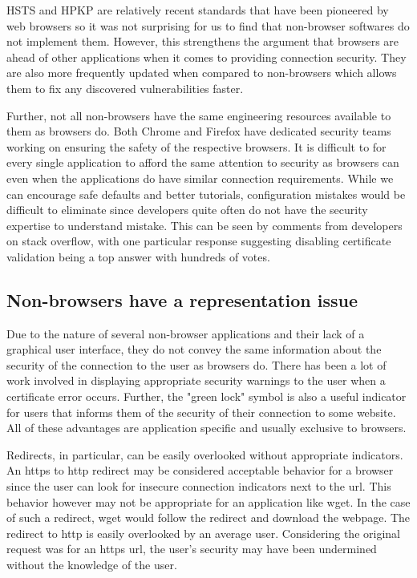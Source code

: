 HSTS and HPKP are relatively recent standards that have been pioneered by web
browsers so it was not surprising for us to find that non-browser softwares do
not implement them. However, this strengthens the argument that browsers are
ahead of other applications when it comes to providing connection security.
They are also more frequently updated when compared to non-browsers which
allows them to fix any discovered vulnerabilities faster.

Further, not all non-browsers have the same engineering resources available to
them as browsers do. Both Chrome and Firefox have dedicated security teams
working on ensuring the safety of the respective browsers. It is difficult to
for every single application to afford the same attention to security as
browsers can even when the applications do have similar connection
requirements. While we can encourage safe defaults and better tutorials,
configuration mistakes would be difficult to eliminate since developers quite
often do not have the security expertise to understand mistake. This can be
seen by comments from developers on stack overflow, with one particular
response suggesting disabling certificate validation being a top answer with
hundreds of votes\cite{stackoverflow-certificate}.

\subsection{Non-browsers have a representation issue}
Due to the nature of several non-browser applications and their lack of a
graphical user interface, they do not convey the same information about the
security of the connection to the user as browsers do. There has been a lot of
work involved in displaying appropriate security warnings to the user when a
certificate error occurs\cite{improve-warnings}. Further, the "green lock"
symbol is also a useful indicator for users that informs them of the security
of their connection to some website. All of these advantages are application
specific and usually exclusive to browsers.

Redirects, in particular, can be easily overlooked without appropriate
indicators. An https to http redirect may be considered acceptable behavior for
a browser since the user can look for insecure connection indicators next to
the url. This behavior however may not be appropriate for an application like
wget. In the case of such a redirect, wget would follow the redirect and
download the webpage. The redirect to http is easily overlooked by an average
user. Considering the original request was for an https url, the user's
security may have been undermined without the knowledge of the user.


